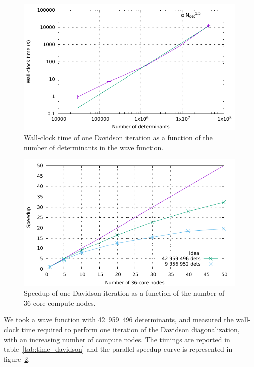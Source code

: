 \documentclass[./thesis.tex]{subfiles}
\begin{document}
\begin{figure}[h]
    \begin{center}
      \includegraphics[width=0.8\columnwidth]{figures/perf/scaling_davidson_ndet}
      \caption{Wall-clock time of one Davidson iteration as a function of the number of
determinants in the wave function.}
      \label{fig:speedup_davidson_ndet}
    \end{center}
\end{figure}

\begin{figure}[h]
    \begin{center}
      \includegraphics[width=0.8\columnwidth]{figures/perf/scaling_davidson}
      \caption{Speedup of one Davidson iteration as a function of the number of
36-core compute nodes.}
      \label{fig:speedup_davidson}
    \end{center}
\end{figure}

We took a wave function with 42~959~496 determinants, and measured the wall-clock time required to
perform one iteration of the Davidson diagonalization, with an increasing number of compute nodes.
The timings are reported in table~\ref{tab:time_davidson} and the parallel speedup curve is represented in figure~\ref{fig:speedup_davidson}.
\end{document}
